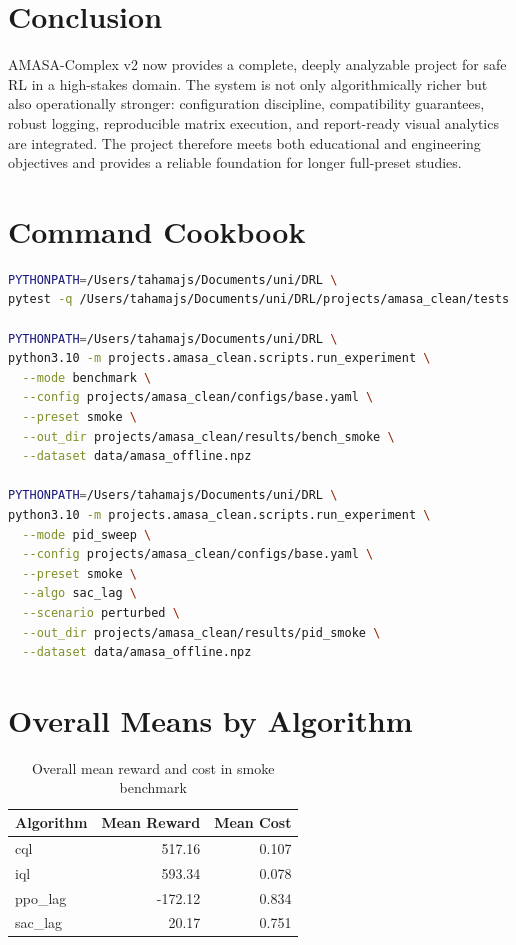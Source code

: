 \documentclass[conference]{IEEEtran}
\begin{document}
\section{Conclusion}
AMASA-Complex v2 now provides a complete, deeply analyzable project for safe RL in a high-stakes domain. The system is not only algorithmically richer but also operationally stronger: configuration discipline, compatibility guarantees, robust logging, reproducible matrix execution, and report-ready visual analytics are integrated. The project therefore meets both educational and engineering objectives and provides a reliable foundation for longer full-preset studies.

\appendices
\section{Command Cookbook}
\begin{lstlisting}[language=bash,basicstyle=\ttfamily\footnotesize,breaklines=true]
PYTHONPATH=/Users/tahamajs/Documents/uni/DRL \
pytest -q /Users/tahamajs/Documents/uni/DRL/projects/amasa_clean/tests

PYTHONPATH=/Users/tahamajs/Documents/uni/DRL \
python3.10 -m projects.amasa_clean.scripts.run_experiment \
  --mode benchmark \
  --config projects/amasa_clean/configs/base.yaml \
  --preset smoke \
  --out_dir projects/amasa_clean/results/bench_smoke \
  --dataset data/amasa_offline.npz

PYTHONPATH=/Users/tahamajs/Documents/uni/DRL \
python3.10 -m projects.amasa_clean.scripts.run_experiment \
  --mode pid_sweep \
  --config projects/amasa_clean/configs/base.yaml \
  --preset smoke \
  --algo sac_lag \
  --scenario perturbed \
  --out_dir projects/amasa_clean/results/pid_smoke \
  --dataset data/amasa_offline.npz
\end{lstlisting}

\section{Overall Means by Algorithm}
\begin{table}[!h]
\centering
\caption{Overall mean reward and cost in smoke benchmark}
\begin{tabular}{lrr}
\toprule
Algorithm & Mean Reward & Mean Cost \\
\midrule
cql & 517.16 & 0.107 \\
iql & 593.34 & 0.078 \\
ppo\_lag & -172.12 & 0.834 \\
sac\_lag & 20.17 & 0.751 \\
\bottomrule
\end{tabular}
\end{table}
\end{document}
